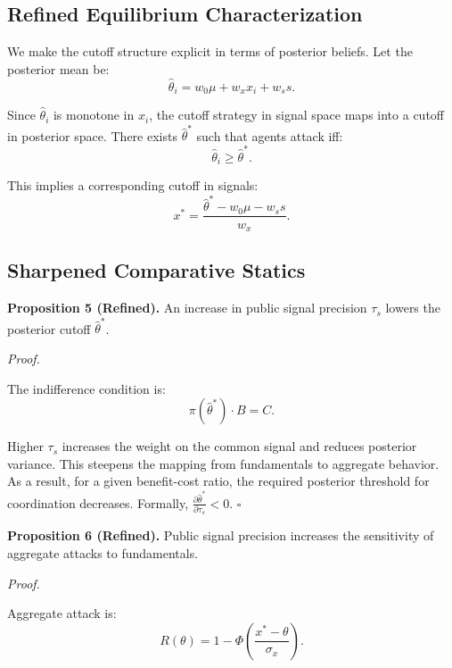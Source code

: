 \subsection{Refined Equilibrium Characterization}

We make the cutoff structure explicit in terms of posterior beliefs. Let the posterior mean be:
\begin{equation}
\hat{\theta}_i = w_0 \mu + w_x x_i + w_s s.
\end{equation}

Since $\hat{\theta}_i$ is monotone in $x_i$, the cutoff strategy in signal space maps into a cutoff in posterior space. There exists $\hat{\theta}^*$ such that agents attack iff:
\begin{equation}
\hat{\theta}_i \geq \hat{\theta}^*.
\end{equation}

This implies a corresponding cutoff in signals:
\begin{equation}
x^* = \frac{\hat{\theta}^* - w_0 \mu - w_s s}{w_x}.
\end{equation}

\subsection{Sharpened Comparative Statics}

\textbf{Proposition 5 (Refined).} An increase in public signal precision $\tau_s$ lowers the posterior cutoff $\hat{\theta}^*$.

\textit{Proof.}

The indifference condition is:
\begin{equation}
\pi(\hat{\theta}^*) \cdot B = C.
\end{equation}

Higher $\tau_s$ increases the weight on the common signal and reduces posterior variance. This steepens the mapping from fundamentals to aggregate behavior. As a result, for a given benefit-cost ratio, the required posterior threshold for coordination decreases. Formally, $\frac{\partial \hat{\theta}^*}{\partial \tau_s} < 0$. \hfill $\square$

\textbf{Proposition 6 (Refined).} Public signal precision increases the sensitivity of aggregate attacks to fundamentals.

\textit{Proof.}

Aggregate attack is:
\begin{equation}
R(\theta) = 1 - \Phi\left(\frac{x^* - \theta}{\sigma_x}\right).
\end{equation}

